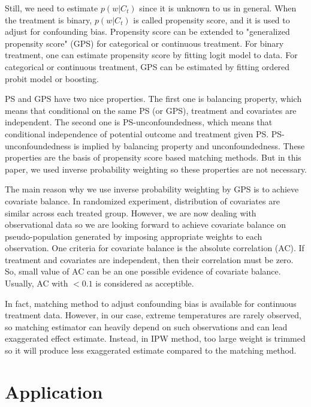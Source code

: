 \documentclass[12pt]{article}
\begin{document}
Still, we need to estimate $p(w\lvert C_t)$ since it is unknown to us in general.
When the treatment is binary, $p(w\lvert C_t)$ is called propensity score,
and it is used to adjust for confounding bias\cite{rosenbaum1983}.
Propensity score can be extended to 
"generalized propensity score" (GPS) for categorical or continuous treatment\cite{imbens2000}.
For binary treatment, one can estimate propensity score by fitting logit model to data.
For categorical or continuous treatment, GPS can be estimated by fitting ordered probit model or boosting.

PS and GPS have two nice properties\cite{rosenbaum1983, hirano2004}.
The first one is balancing property, which means that conditional on the same PS (or GPS),
treatment and covariates are independent.
The second one is PS-unconfoundedness, 
which means that conditional independence of potential outcome and treatment given PS.
PS-unconfoundedness is implied by balancing property and unconfoundedness.
These properties are the basis of propensity score based matching methods.
But in this paper, we used inverse probability weighting so these properties are not necessary.

The main reason why we use inverse probability weighting by GPS is to achieve covariate balance.
In randomized experiment, distribution of covariates are similar across each treated group.
However, we are now dealing with observational data 
so we are looking forward to achieve covariate balance on pseudo-population generated by
imposing appropriate weights to each observation.
One criteria for covariate balance is the absolute correlation (AC)\cite{gpsboosting2015}.
If treatment and covariates are independent, then their correlation must be zero.
So, small value of AC can be an one possible evidence of covariate balance.
Usually, AC with $ <0.1 $ is considered as acceptible.

In fact, matching method to adjust confounding bias is available for continuous treatment data\cite{wu2020arxiv}.
However, in our case, extreme temperatures are rarely observed,
so matching estimator can heavily depend on such observations and can lead exaggerated effect estimate.
Instead, in IPW method, too large weight is trimmed so it will produce less exaggerated estimate
compared to the matching method.

\section{Application}
\end{document}

